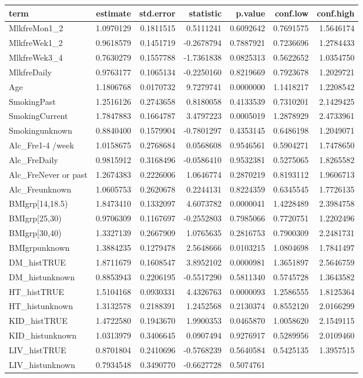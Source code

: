 \documentclass[]{article}
\begin{document}
\begin{longtable}[]{@{}lrrrrrr@{}}
\toprule
term & estimate & std.error & statistic & p.value & conf.low &
conf.high\tabularnewline
\midrule
\endhead
MlkfreMon1\_2 & 1.0970129 & 0.1811515 & 0.5111241 & 0.6092642 &
0.7691575 & 1.5646174\tabularnewline
MlkfreWek1\_2 & 0.9618579 & 0.1451719 & -0.2678794 & 0.7887921 &
0.7236696 & 1.2784433\tabularnewline
MlkfreWek3\_4 & 0.7630279 & 0.1557788 & -1.7361838 & 0.0825313 &
0.5622652 & 1.0354750\tabularnewline
MlkfreDaily & 0.9763177 & 0.1065134 & -0.2250160 & 0.8219669 & 0.7923678
& 1.2029721\tabularnewline
Age & 1.1806768 & 0.0170732 & 9.7279741 & 0.0000000 & 1.1418217 &
1.2208542\tabularnewline
SmokingPast & 1.2516126 & 0.2743658 & 0.8180058 & 0.4133539 & 0.7310201
& 2.1429425\tabularnewline
SmokingCurrent & 1.7847883 & 0.1664787 & 3.4797223 & 0.0005019 &
1.2878929 & 2.4733961\tabularnewline
Smokingunknown & 0.8840400 & 0.1579904 & -0.7801297 & 0.4353145 &
0.6486198 & 1.2049071\tabularnewline
Alc\_Fre1-4 /week & 1.0158675 & 0.2768684 & 0.0568608 & 0.9546561 &
0.5904271 & 1.7478650\tabularnewline
Alc\_FreDaily & 0.9815912 & 0.3168496 & -0.0586410 & 0.9532381 &
0.5275065 & 1.8265582\tabularnewline
Alc\_FreNever or past & 1.2674383 & 0.2226006 & 1.0646774 & 0.2870219 &
0.8193112 & 1.9606713\tabularnewline
Alc\_Freunknown & 1.0605753 & 0.2620678 & 0.2244131 & 0.8224359 &
0.6345545 & 1.7726135\tabularnewline
BMIgrp{[}14,18.5) & 1.8473410 & 0.1332097 & 4.6073782 & 0.0000041 &
1.4228489 & 2.3984758\tabularnewline
BMIgrp{[}25,30) & 0.9706309 & 0.1167697 & -0.2552803 & 0.7985066 &
0.7720751 & 1.2202496\tabularnewline
BMIgrp{[}30,40) & 1.3327139 & 0.2667909 & 1.0765635 & 0.2816753 &
0.7900309 & 2.2481731\tabularnewline
BMIgrpunknown & 1.3884235 & 0.1279478 & 2.5648666 & 0.0103215 &
1.0804698 & 1.7841497\tabularnewline
DM\_histTRUE & 1.8711679 & 0.1608547 & 3.8952102 & 0.0000981 & 1.3651897
& 2.5646759\tabularnewline
DM\_histunknown & 0.8853943 & 0.2206195 & -0.5517290 & 0.5811340 &
0.5745728 & 1.3643582\tabularnewline
HT\_histTRUE & 1.5104168 & 0.0930331 & 4.4326763 & 0.0000093 & 1.2586555
& 1.8125364\tabularnewline
HT\_histunknown & 1.3132578 & 0.2188391 & 1.2452568 & 0.2130374 &
0.8552120 & 2.0166299\tabularnewline
KID\_histTRUE & 1.4722580 & 0.1943670 & 1.9900353 & 0.0465870 &
1.0058620 & 2.1549115\tabularnewline
KID\_histunknown & 1.0313979 & 0.3406645 & 0.0907494 & 0.9276917 &
0.5289956 & 2.0109460\tabularnewline
LIV\_histTRUE & 0.8701804 & 0.2410696 & -0.5768239 & 0.5640584 &
0.5425135 & 1.3957515\tabularnewline
LIV\_histunknown & 0.7934548 & 0.3490770 & -0.6627728 & 0.5074761 &

\end{longtable}
\end{document}
